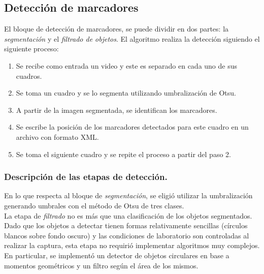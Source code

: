 \subsection{Detección de marcadores}
El bloque de detección de marcadores, se puede dividir en dos partes: la \textit{segmentación} y el \textit{filtrado de objetos}.
%
El algoritmo realiza la detección siguiendo el siguiente proceso:
%
\begin{enumerate}
  \item Se recibe como entrada un video y este es separado en cada uno de sus cuadros.
  \item Se toma un cuadro y se lo segmenta utilizando umbralización de Otsu.
  \item A partir de la imagen segmentada, se identifican los marcadores.
  \item Se escribe la posición de los marcadores detectados para este cuadro en un archivo con formato XML.
  \item Se toma el siguiente cuadro y se repite el proceso a partir del paso 2.
\end{enumerate}
%
\subsubsection{Descripción de las etapas de detección.}
En lo que respecta al bloque de \textit{segmentación}, se eligió utilizar la umbralización generando umbrales con el método de Otsu\cite{otsu} de tres clases.\\
%
La etapa de \textit{filtrado} no es más que una clasificación de los objetos segmentados. Dado que los objetos a detectar tienen formas relativamente sencillas (círculos blancos sobre fondo oscuro) y las condiciones de laboratorio son controladas al realizar la captura, esta etapa no requirió implementar algoritmos muy complejos. En particular, se implementó un detector de objetos circulares en base a momentos geométricos\cite{imageMoments} y un filtro según el área de los mismos.
%
